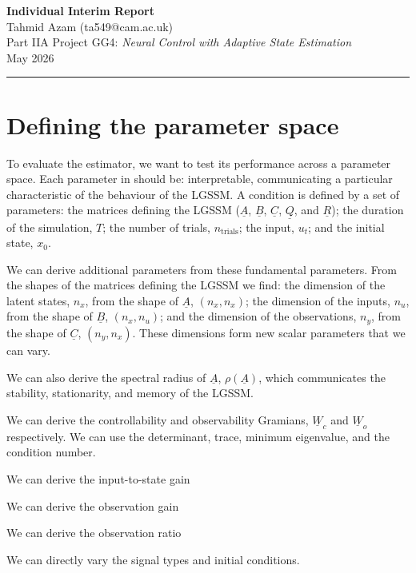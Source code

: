\documentclass[a4paper, 10pt]{article}
\begin{document}
\noindent \textbf{Individual Interim Report}\\
\noindent Tahmid Azam (ta549@cam.ac.uk)\\
\noindent Part IIA Project GG4: \textit{Neural Control with Adaptive State Estimation}\\
 May 2026

\vspace{1em}
\hrule
\vspace{1em}


\section*{Defining the parameter space}

To evaluate the estimator, we want to test its performance across a parameter space. Each parameter in should be: interpretable, communicating a particular characteristic of the behaviour of the LGSSM. A condition is defined by a set of parameters: the matrices defining the LGSSM ($\underline{A}$, $\underline{B}$, $\underline{C}$, $\underline{Q}$, and $\underline{R}$); the duration of the simulation, $T$; the number of trials, $n_\text{trials}$; the input, $u_t$; and the initial state, $x_0$.

We can derive additional parameters from these fundamental parameters. From the shapes of the matrices defining the LGSSM we find: the dimension of the latent states, $n_x$, from the shape of $\underline{A}$, $(n_x, n_x)$; the dimension of the inputs, $n_u$, from the shape of $\underline{B}$, $(n_x, n_u)$; and the dimension of the observations, $n_y$, from the shape of $\underline{C}$, $(n_y, n_x)$. These dimensions form new scalar parameters that we can vary.

We can also derive the spectral radius of $\underline{A}$, $\rho(\underline{A})$, which communicates the stability, stationarity, and memory of the LGSSM.

We can derive the controllability and observability Gramians, $\underline{W}_c$ and $\underline{W}_o$ respectively. We can use the determinant, trace, minimum eigenvalue, and the condition number.

We can derive the input-to-state gain

We can derive the observation gain

We can derive the observation ratio

We can directly vary the signal types and initial conditions.
\end{document}
